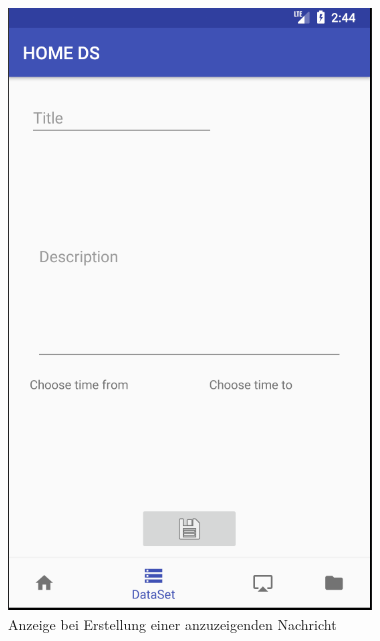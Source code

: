 \begin{figure}[H]
\centering
\includegraphics[scale=0.35]{images/06_AndroidApp/06_NewNewsEdit}
\caption{Anzeige bei Erstellung einer anzuzeigenden Nachricht}
\label{fig:mediaNav}
\end{figure}
\\
